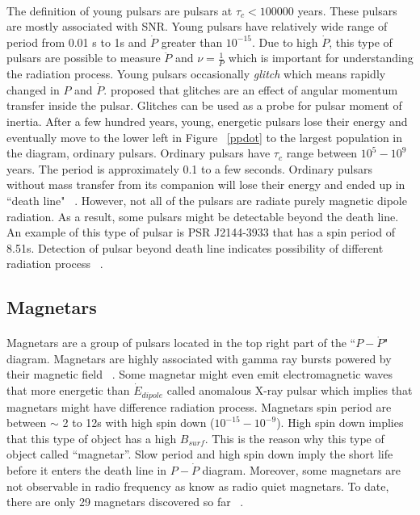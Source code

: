 \documentclass[thesis_msc.tex]{subfiles}
\begin{document}
\paragraph{} The definition of young pulsars are pulsars at $\tau_c < 100000$ years. These pulsars are mostly associated with SNR. Young pulsars have relatively wide range of period from 0.01 s to 1s and $\dot{P}$ greater than $10^{-15}$. Due to high $\dot{P}$, this type of pulsars are possible to measure $\ddot{P}$ and $\nu=\frac{1}{P}$ which is important for understanding the radiation process. Young pulsars occasionally \textit{glitch} which means rapidly changed in $P$ and $\dot{P}$. \cite{link1992pulsar} proposed that glitches are an effect of angular momentum transfer inside the pulsar. Glitches can be used as a probe for pulsar moment of inertia. After a few hundred years, young, energetic pulsars lose their energy and eventually move to the lower left in Figure ~\ref{ppdot} to the largest population in the diagram, ordinary pulsars. Ordinary pulsars have $\tau_c$ range between $10^5 - 10^9$ years. The period is approximately 0.1 to a few seconds. Ordinary pulsars without mass transfer from its companion will lose their energy and ended up in  ``death line" ~\citep{chen1993pulsar}. However, not all of the pulsars are radiate purely magnetic dipole radiation. As a result, some pulsars might be detectable beyond the death line.  An example of this type of pulsar is PSR J2144-3933 that has a spin period of 8.51s. Detection of pulsar beyond death line indicates possibility of different radiation process ~\citep{zhang2000radio}.        


\subsection{Magnetars} \label{magnetar}

\paragraph{} Magnetars are a group of pulsars located in the top right part of the ``$P-\dot{P}$" diagram. Magnetars are highly associated with gamma ray bursts powered by their magnetic field ~\citep{duncan1992formation}. Some magnetar might even emit electromagnetic waves that more energetic than $\dot{E}_{dipole}$ called anomalous X-ray pulsar which implies that magnetars might have difference radiation process. Magnetars spin period are between $\sim$ 2 to 12s with high spin down ($10^{-15}-10^{-9}$). High spin down implies that this type of object has a high $B_{surf}$. This is the reason why this type of object called ``magnetar''. Slow period and high spin down imply the short life before it enters the death line in $P-\dot{P}$ diagram.  Moreover, some magnetars are not observable in radio frequency as know as radio quiet  magnetars. To date, there are only 29 magnetars discovered so far ~\citep{Olausen:2013bpa}.
\end{document}
